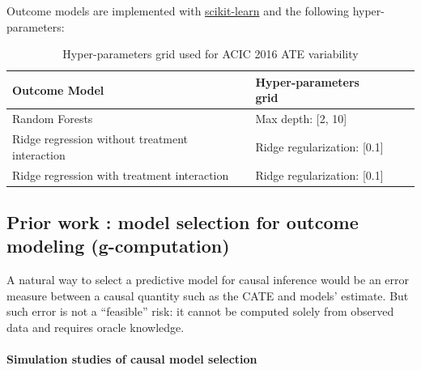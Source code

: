 \documentclass[a4paper,num-refs]{oup-contemporary}%
\begin{document}
Outcome models are implemented with
\href{https://scikit-learn.org/stable/}{scikit-learn}
\cite{pedregosa_scikitlearn_2011} and the following hyper-parameters:

\begin{table}[h!]
    \centering
    \begin{tabular}{llll}
        \toprule
        Outcome Model                                  & Hyper-parameters grid
        \\
        \midrule
        Random Forests                                 & Max depth: [2,
        10]                                                                    \\

        Ridge regression without treatment interaction & Ridge regularization:
        [0.1]                                                                  \\

        Ridge regression with treatment interaction    & Ridge regularization:
        [0.1]                                                                  \\
        \bottomrule
    \end{tabular}
    \caption{Hyper-parameters grid used for ACIC 2016 ATE variability}
    \label{apd:toy_example:acic_2016_ate_variability:table}
\end{table}

\subsection{Prior work : model selection for outcome modeling (g-computation)}\label{apd:prior_work}

A natural way to select a predictive model for causal inference would be
an error measure between a causal quantity such as the CATE and models' estimate. But such error is
not a ``feasible'' risk: it cannot be computed solely from observed data
and requires oracle knowledge.


\paragraph{Simulation studies of causal model selection}
\end{document}
